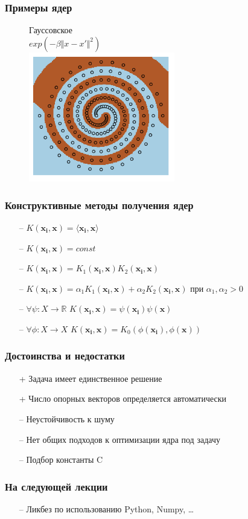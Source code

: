\documentclass[12pt]{beamer}
\begin{document}
\begin{frame}\frametitle{Примеры ядер}
\begin{figure}[htbp]
  \centering Гауссовское\\$exp(-\beta \Vert x - x'\Vert^2 )$\\
  \includegraphics[height=160pt, keepaspectratio = true]{images/svm_spiral}
\end{figure}
\end{frame}

\begin{frame}\frametitle{Конструктивные методы получения ядер}
\begin{itemize}
\item[--] $K(\mathbf{x_i}, \mathbf{x}) = \langle \mathbf{x_i}, \mathbf{x} \rangle$
\item[--] $K(\mathbf{x_i}, \mathbf{x}) = const$
\item[--] $K(\mathbf{x_i}, \mathbf{x}) = K_1(\mathbf{x_i}, \mathbf{x}) K_2(\mathbf{x_i}, \mathbf{x})$
\item[--] $K(\mathbf{x_i}, \mathbf{x}) = \alpha_1 K_1(\mathbf{x_i}, \mathbf{x}) + \alpha_2 K_2(\mathbf{x_i}, \mathbf{x})$ при  $\alpha_1, \alpha_2 > 0$
\item[--] $\forall \psi: X \rightarrow \mathbb{R}$ \hspace{5mm}$K(\mathbf{x_i}, \mathbf{x}) = \psi(\mathbf{x_i}) \psi(\mathbf{x})$
\item[--] $\forall \phi: X \rightarrow X$ \hspace{5mm}$K(\mathbf{x_i}, \mathbf{x}) = K_0(\phi(\mathbf{x_i}),  \phi(\mathbf{x}))$
\end{itemize}
\end{frame}

\begin{frame}\frametitle{Достоинства и недостатки}
\begin{itemize}
\item[+] Задача имеет единственное решение
\item[+] Число опорных векторов определяется автоматически
\end{itemize}
\begin{itemize}
\item[--] Неустойчивость к шуму
\item[--] Нет общих подходов к оптимизации ядра под задачу
\item[--] Подбор константы C
\end{itemize}
\end{frame}

\begin{frame}\frametitle{На следующей лекции}

\begin{itemize}
\item[--] Ликбез по использованию Python, Numpy, \dots
\end{itemize}
\end{frame}
\end{document}
